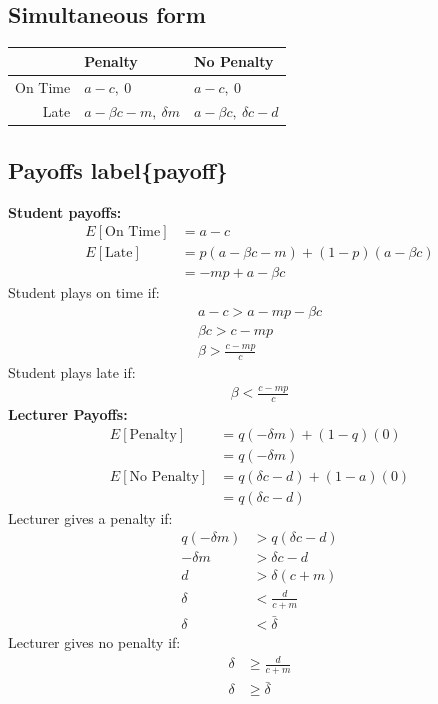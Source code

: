 \documentclass[11pt,preprint, authoryear]{elsarticle}
\let\origtable\table
\let\endorigtable\endtable
\renewenvironment{table}[1][2] {
    \expandafter\origtable\expandafter[H]
} {
    \endorigtable
}
\numberwithin{equation}{section}
\numberwithin{figure}{section}
\numberwithin{table}{section}
\begin{document}
\hypertarget{simultaneous-form}{%
\subsection*{\texorpdfstring{Simultaneous form
\label{sim}}{Simultaneous form }}\label{simultaneous-form}}

\begin{table}[H]
\centering
\begin{tabular}{rll}
  \toprule
 & Penalty & No Penalty \\ 
  \midrule
On Time & $a-c, \ 0$ & $a-c, \ 0$ \\ 
  Late & $a-\beta c - m, \ \delta m$ & $a-\beta c, \ \delta c -d$ \\ 
   \bottomrule
\end{tabular}
\caption{Simultaneous Game \label{tab1}} 
\end{table}

\hypertarget{payoffs-labelpayoff}{%
\subsection*{Payoffs label\{payoff\}}\label{payoffs-labelpayoff}}

\textbf{Student payoffs:} \begin{align*}
E[\text{On Time}]&= a- c \\
E[\text{Late}]&=  p(a-\beta c-m) +(1-p)(a-\beta c) \\
&=-m p+a-\beta c
\end{align*} Student plays on time if: \begin{align*}
a-c>a-m p-\beta c \\
\beta c>c-m p \\
\beta>\frac{c-m p}{c}
\end{align*} Student plays late if: \begin{align*}
\beta<\frac{c-m p}{c}
\end{align*} \textbf{Lecturer Payoffs:} \begin{align*}
E[\text{Penalty}]&=q(-\delta m)+(1-q)(0) \\
&=q(-\delta m) \\
E[\text{No Penalty}] &=q(\delta c-d)+(1-a)(0) \\
&=q(\delta c-d)
\end{align*} Lecturer gives a penalty if: \begin{align*}
q(-\delta m)&>q(\delta c-d) \\
-\delta m&>\delta c-d \\
d&>\delta(c+m) \\
\delta&<\frac{d}{c+m} \\
\delta &<\bar{\delta}
\end{align*} Lecturer gives no penalty if: \begin{align*}
\delta &\geq \frac{d}{c+m} \\
\delta &\geq \bar{\delta} \\
\end{align*}
\end{document}
